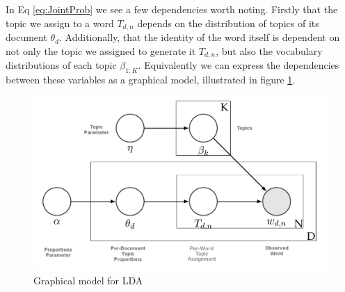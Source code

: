 In Eq \ref{eq:JointProb} we see a few dependencies worth noting. Firstly that the topic we assign to a word $T_{d,n}$ depends on the distribution of topics of its document $\theta_d$. Additionally, that the identity of the word itself is dependent on not only the topic we assigned to generate it $T_{d,n}$, but also the vocabulary distributions of each topic $\beta_{1:K}$. Equivalently we can express the dependencies between these variables as a graphical model, illustrated in figure \ref{fig:Gmod1}.

\begin{figure}[ht]
\centering
\includegraphics[width=130mm,scale=0.45]{Figures/gmod1}
 
  
\caption{Graphical model for LDA}
\label{fig:Gmod1}
\end{figure}

